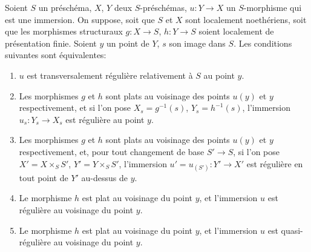 \begin{proposition}[19.2.4]
\label{IV.19.2.4}
Soient $S$ un préschéma, $X$, $Y$ deux $S$-préschémas, $u:Y\to X$ un $S$-morphisme qui est une immersion. On suppose, soit que $S$ et $X$ sont localement noethériens, soit que les morphismes structuraux $g:X\to S$, $h:Y\to S$ soient localement de présentation finie. Soient $y$ un point de $Y$, $s$ son image dans $S$. Les conditions suivantes sont équivalentes:
\begin{enumerate}
  \item[a)] $u$ est transversalement régulière relativement à $S$ au point $y$.
  \item[b)] Les morphismes $g$ et $h$ sont plats au voisinage des points $u(y)$ et $y$ respectivement, et si l'on pose $X_s=g^{-1}(s)$, $Y_s=h^{-1}(s)$, l'immersion $u_s:Y_s\to X_s$ est régulière au point $y$.
  \item[b$'$)] Les morphismes $g$ et $h$ sont plats au voisinage des points $u(y)$ et $y$ respectivement, et, pour tout changement de base $S'\to S$, si l'on pose $X'=X\times_S S'$, $Y'=Y\times_S S'$, l'immersion $u'=u_{(S')}:Y'\to X'$ est régulière en tout point de $Y'$ au-dessus de $y$.
  \item[c)] Le morphisme $h$ est plat au voisinage du point $y$, et l'immersion $u$ est régulière au voisinage du point $y$.


  \item[c$'$)] Le morphisme $h$ est plat au voisinage du point $y$, et l'immersion $u$ est quasi-régulière au voisinage du point $y$.
\end{enumerate}
\end{proposition}

